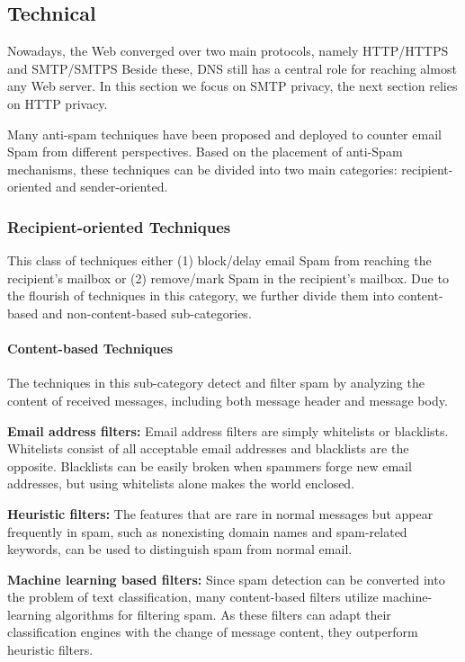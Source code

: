 \subsection{Technical}

Nowadays, the Web converged over two main protocols,
	namely HTTP/HTTPS and SMTP/SMTPS
Beside these,
	DNS still has a central role for reaching almost any Web server.
In this section we focus on SMTP privacy,
	the next section relies on HTTP privacy.

Many anti-spam techniques have been proposed and deployed to counter email Spam from different perspectives.
Based on the placement of anti-Spam mechanisms,
	these techniques can be divided into two main categories: recipient-oriented and sender-oriented.

\subsubsection{Recipient-oriented Techniques}

This class of techniques either
	(1) block/delay email Spam from reaching the recipient’s mailbox or
	(2) remove/mark Spam in the recipient’s mailbox.
Due to the flourish of techniques in this category,
	we further divide them into content-based and non-content-based sub-categories.

\paragraph{Content-based Techniques}
The techniques in this sub-category detect and filter spam by analyzing the content of received messages,
	including both message header and message body.

\textbf{Email address filters:} Email address filters are simply whitelists or blacklists.
Whitelists consist of all acceptable email addresses and blacklists are the opposite.
Blacklists can be easily broken when spammers forge new email addresses,
	but using whitelists alone makes the world enclosed.

\textbf{Heuristic filters:} The features that are rare in normal messages but appear frequently in spam,
	such as nonexisting domain names and spam-related keywords,
	can be used to distinguish spam from normal email.

\textbf{Machine learning based filters:} Since spam detection can be converted into the problem of text classification,
	many content-based filters utilize machine-learning algorithms for filtering spam.
As these filters can adapt their classification engines with the change of message content,
	they outperform heuristic filters.

